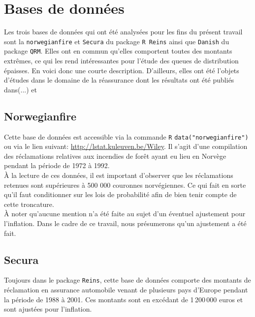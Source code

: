 \section{Bases de données}
Les trois bases de données qui ont été analysées pour les fins du présent travail sont la \texttt{norwegianfire} et \texttt{Secura} du package \texttt{R Reins} ainsi que \texttt{Danish} du package \texttt{QRM}. Elles ont en commun qu'elles comportent toutes des montants extrêmes, ce qui les rend intéressantes pour l'étude des queues de distribution épaisses. En voici donc une courte description. D'ailleurs, elles ont été l'objets d'études dans le domaine de la réassurance dont les résultats ont été publiés dans(...) \cite{norwegianfireEtSecura} et \cite{Danish}

	\subsection{Norwegianfire}
	Cette base de données est accessible via la commande \texttt{R} \texttt{data("norwegianfire")} ou via le lien suivant: \url{http://lstat.kuleuven.be/Wiley}. Il s'agit d'une compilation des réclamations relatives aux incendies de forêt ayant eu lieu en Norvège pendant la période de 1972 à 1992.\\ 
	
	À la lecture de ces données, il est important d'observer que les réclamations retenues sont supérieures à 500 000 couronnes norvégiennes. Ce qui fait en sorte qu'il faut conditionner sur les lois de probabilité afin de bien tenir compte de cette troncature.\\
	
	À noter qu'aucune mention n'a été faite au sujet d'un éventuel ajustement pour l'inflation. Dans le cadre de ce travail, nous présumerons qu'un ajustement a été fait.
	
	
	\subsection{Secura}
	Toujours dans le package \texttt{Reins}, cette base de données comporte des montants de réclamation en assurance automobile venant de plusieurs pays d'Europe pendant la période de 1988 à 2001. Ces montants sont en excédant de 1\,200\,000 euros et sont ajustées pour l'inflation.
	
